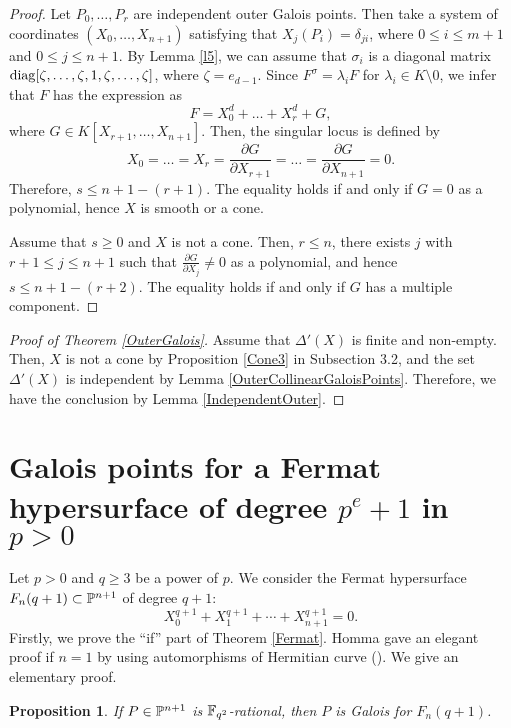 \documentclass[10pt,oneside]{amsart}
\newtheorem{proposition}{Proposition}
\theoremstyle{definition}
\begin{document}
\begin{proof} 
Let $P_0, \ldots, P_r$ are independent outer Galois points. 
Then take a system of coordinates $(X_0, \ldots, X_{n+1})$ satisfying that $X_j(P_i)=\delta_{ji}$, where $0 \le i \le m+1$ and $0 \le j \le n+1$. 
By Lemma \ref{l5}, we can assume that $\sigma_i$ is a diagonal matrix ${\rm diag}[\zeta, \ldots, \zeta, 1, \zeta, \ldots, \zeta]$, where $\zeta=e_{d-1}$. 
Since $F^{\sigma}=\lambda_iF$ for $\lambda_i \in K \setminus 0$, we infer that $F$ has the expression as 
$$ F=X_{0}^{d}+\dots+X_{r}^{d}+G, $$
where $G \in K[X_{r+1}, \ldots, X_{n+1}]$. 
Then, the singular locus is defined by 
$$ X_0=\dots=X_r=\frac{\partial G}{\partial X_{r+1}}=\dots=\frac{\partial G}{\partial X_{n+1}}=0. $$
Therefore, $s \le n+1-(r+1)$. 
The equality holds if and only if $G=0$ as a polynomial, hence $X$ is smooth or a cone. 

Assume that $s \ge 0$ and $X$ is not a cone. 
Then, $r \le n$, there exists $j$ with $r+1 \le j \le n+1$ such that $\frac{\partial G}{\partial X_{j}} \ne 0$ as a polynomial, and hence $s \le n+1-(r+2)$. 
The equality holds if and only if $G$ has a multiple component. 
\end{proof}

\begin{proof}[Proof of Theorem \ref{OuterGalois}]
Assume that $\Delta'(X)$ is finite and non-empty. 
Then, $X$ is not a cone by Proposition \ref{Cone3} in Subsection 3.2, and the set $\Delta'(X)$ is independent by Lemma \ref{OuterCollinearGaloisPoints}. 
Therefore, we have the conclusion by Lemma \ref{IndependentOuter}. 
\end{proof}

\section{Galois points for a Fermat hypersurface of degree $p^e+1$ in $p>0$} 
Let $p>0$ and $q \ge 3$ be a power of $p$. 
We consider the Fermat hypersurface $F_n(q+1) \subset \Bbb P^{n+1}$ of degree $q+1$: 
\begin{equation}
X_0^{q+1}+X_1^{q+1}+\cdots+X_{n+1}^{q+1}=0. 
\end{equation} 
Firstly, we prove the ``if'' part of Theorem \ref{Fermat}. 
Homma gave an elegant proof if $n=1$ by using automorphisms of Hermitian curve (\cite[Claims 1 and 2]{homma}).  
We give an elementary proof.  

\begin{proposition}
If $P \in \Bbb P^{n+1}$ is $\Bbb F_{q^2}$-rational, then $P$ is Galois for $F_n(q+1)$. 
\end{proposition} 
\end{document}
